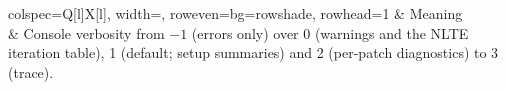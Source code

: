 \begin{longtblr}{colspec={Q[l]X[l]}, width=\linewidth, row{even}={bg=rowshade}, rowhead=1}
\toprule
{} & Meaning\\
\midrule
{} & Console verbosity from $-1$ (errors only) over 0 (warnings and the NLTE iteration table), 1 (default; setup summaries) and 2 (per-patch diagnostics) to 3 (trace).\\
\bottomrule
\end{longtblr}
